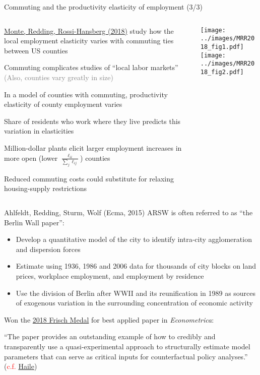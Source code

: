 \documentclass[11pt,notes=hide,aspectratio=169]{beamer}
\begin{document}
\begin{frame}{Commuting and the productivity elasticity of employment (3/3)}
\vspace{2mm}
\begin{columns}
\begin{column}{0.62\textwidth}
{\href{https://www.aeaweb.org/articles?id=10.1257/aer.20151507}{Monte, Redding, Rossi-Hansberg (2018)} study how the local employment elasticity varies with commuting ties between US counties\par}
\begin{itemize}{\small
\item Commuting complicates studies of ``local labor markets''
\textcolor{gray}{(Also, counties vary greatly in size)}
\item In a model of counties with commuting, productivity elasticity of county employment varies
\item Share of residents who work where they live predicts this variation in elasticities
\item Million-dollar plants elicit larger employment increases in more open (lower $\frac{\ell_{ii}}{\sum_{j} \ell_{ij}}$) counties
\item {Reduced commuting costs could substitute for relaxing housing-supply restrictions\par}
}\end{itemize}
\end{column}
\begin{column}{0.36\textwidth}
\texttt{[image: ../images/MRR2018\_fig1.pdf]}\\
\texttt{[image: ../images/MRR2018\_fig2.pdf]}
\end{column}
\end{columns}
\end{frame}
\begin{frame}{Ahlfeldt, Redding, Sturm, Wolf (Ecma, 2015)}
ARSW is often referred to as ``the Berlin Wall paper'':
\begin{itemize}
\item Develop a quantitative model of the city to identify intra-city agglomeration and dispersion forces
\item Estimate using 1936, 1986 and 2006 data for thousands of city blocks on land prices, workplace employment, and employment by residence
\item Use the division of Berlin after WWII and its reunification in 1989 as sources of exogenous variation in the surrounding concentration of economic activity
\end{itemize}
Won the \href{https://www.econometricsociety.org/society/awards}{2018 Frisch Medal} for best applied paper in \textit{Econometrica}:
{\small ``The paper provides an outstanding example of how to credibly and transparently use a quasi-experimental approach to structurally estimate model parameters that can serve as critical inputs for counterfactual policy analyses.''
(\textcolor{red}{c.f.} \href{https://www.dropbox.com/s/8kwtwn30dyac18s/intro.pdf?dl=0}{Haile})\par}
\end{frame}
\end{document}
